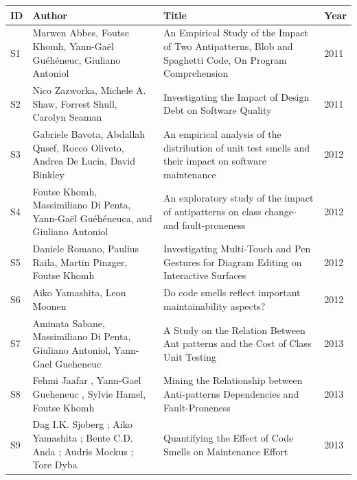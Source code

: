 \documentclass{sigchi}
\begin{document}
\begin{table}[h]
	\centering
	\small
	\begin{tabular}{l| p{25mm} |  p{37mm} | p{3mm}}
		\toprule
		\textbf{ID}& \textbf{Author} & \textbf{Title} & \textbf{Year}\\
		\midrule
		S1 \cite{Abbes} & Marwen Abbes, Foutse Khomh, Yann-Gaël Guéhéneuc, Giuliano Antoniol & An Empirical Study of the Impact of Two Antipatterns, Blob and Spaghetti Code, On Program Comprehension & 2011 \\
		S2 \cite{Zazworka} & Nico Zazworka, Michele A. Shaw, Forrest Shull, Carolyn Seaman & Investigating the Impact of Design Debt on Software Quality & 2011\\
		S3 \cite{Bavota}& Gabriele Bavota, Abdallah Qusef, Rocco Oliveto, Andrea De Lucia, David Binkley & An empirical analysis of the distribution of unit test smells and their impact on software maintenance & 2012\\
		S4 \cite{Khomh}& Foutse Khomh, Massimiliano Di Penta, Yann-Gaël Guéhéneuca, and Giuliano Antoniol & An exploratory study of the impact of antipatterns on class change- and fault-proneness & 2012\\
		S5 \cite{Romano}& Daniele Romano, Paulius Raila, Martin Pinzger, Foutse Khomh & Investigating Multi-Touch and Pen Gestures for Diagram Editing on Interactive Surfaces & 2012\\
		S6 \cite{Yamashita}& Aiko Yamashita, Leon Moonen & Do code smells reflect important maintainability aspects? & 2012\\
		S7 \cite{Sabane}& Aminata Sabane, Massimiliano Di Penta, Giuliano Antoniol, Yann-Gael Gueheneuc & A Study on the Relation Between Ant patterns and the Cost of Class Unit Testing & 2013\\
		S8 \cite{Jaafar}& Fehmi Jaafar , Yann-Gael Gueheneuc , Sylvie Hamel, Foutse Khomh & Mining the Relationship between Anti-patterns Dependencies and Fault-Proneness & 2013\\
		S9 \cite{Sjoberg}& Dag I.K. Sjoberg ; Aiko Yamashita ; Bente C.D. Anda ; Audris Mockus ; Tore Dyba & Quantifying the Effect of Code Smells on
		Maintenance Effort
		 & 2013\\
		
	
		\bottomrule
	\end{tabular}
	
\end{table}
\end{document}
